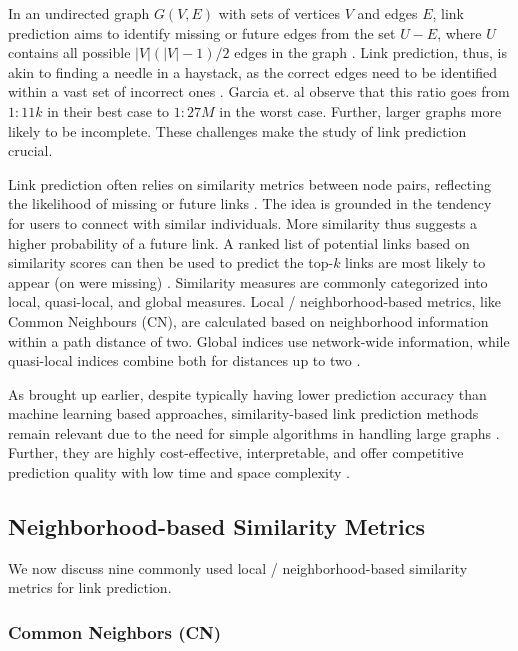 In an undirected graph $G(V, E)$ with sets of vertices $V$ and edges $E$, link prediction aims to identify missing or future edges from the set $U - E$, where $U$ contains all possible $|V|(|V|-1)/2$ edges in the graph \cite{zhou2021progresses}. Link prediction, thus, is akin to finding a needle in a haystack, as the correct edges need to be identified within a vast set of incorrect ones \cite{garcia2014link, wang2014link}. Garcia et. al \cite{garcia2014link} observe that this ratio goes from $1:11k$ in their best case to $1:27M$ in the worst case. Further, larger graphs more likely to be incomplete. These challenges make the study of link prediction crucial.

Link prediction often relies on similarity metrics between node pairs, reflecting the likelihood of missing or future links \cite{wang2014link, arrar2023comprehensive}. The idea is grounded in the tendency for users to connect with similar individuals. More similarity thus suggests a higher probability of a future link. A ranked list of potential links based on similarity scores can then be used to predict the top-$k$ links are most likely to appear (on were missing) \cite{wang2014link}. Similarity measures are commonly categorized into local, quasi-local, and global measures. Local / neighborhood-based metrics, like Common Neighbours (CN), are calculated based on neighborhood information within a path distance of two. Global indices use network-wide information, while quasi-local indices combine both for distances up to two \cite{arrar2023comprehensive}.

As brought up earlier, despite typically having lower prediction accuracy than machine learning based approaches, similarity-based link prediction methods remain relevant due to the need for simple algorithms in handling large graphs \cite{garcia2014link}. Further, they are highly cost-effective, interpretable, and offer competitive prediction quality with low time and space complexity \cite{zhou2021progresses, barbieri2014follow}.




\subsection{Neighborhood-based Similarity Metrics}

We now discuss nine commonly used local / neighborhood-based similarity metrics for link prediction.


\subsubsection{Common Neighbors (CN)}

